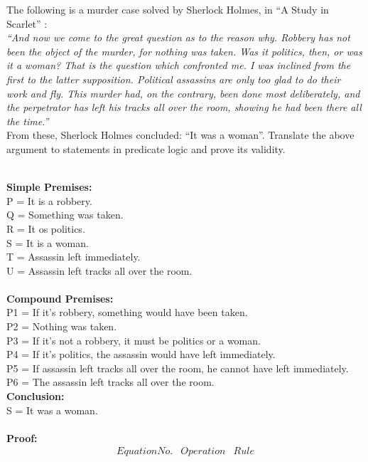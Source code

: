 \documentclass[addpoints]{exam}
\begin{document}
\begin{questions}
\question[10]
  The following is a murder case solved by Sherlock Holmes, in “A Study
  in Scarlet” :\\
  \textit{“And now we come to the great question as to the reason why. Robbery
    has not been the object of the murder, for nothing was taken. Was it
    politics, then, or was it a woman?  That is the question which confronted
    me. I was inclined from the first to the latter supposition. Political
    assassins are only too glad to do their work and fly. This murder had, on
    the contrary, been done most deliberately, and the perpetrator has left
    his tracks all over the room, showing he had been
    there all the time.”}\\
  From these, Sherlock Holmes concluded: ``It was a woman''.  Translate the
  above argument to statements in predicate logic and prove its validity.
  \begin{solution}\\
    \textbf{Simple Premises:}\\
    P = It is a robbery.\\
    Q = Something was taken.\\
    R = It os politics.\\
    S = It is a woman.\\
    T = Assassin left immediately.\\
    U = Assassin left tracks all over the room.\\\\
    \textbf{Compound Premises:}\\
    P1 = If it's robbery, something would have been taken.\\
    P2 = Nothing was taken.\\
    P3 = If it's not a robbery, it must be politics or a woman.\\
    P4 = If it's politics, the assassin would have left immediately.\\
    P5 = If assassin left tracks all over the room, he cannot have left immediately.\\
    P6 = The assassin left tracks all over the room.\\
    \textbf{Conclusion:}\\
    S = It was a woman.\\\\
    \textbf{Proof:}\\
    \[
      \begin{array}{c|c|c}
        Equation No. & Operation                     & Rule                              \\

\end{array}\]
\end{solution}
\end{questions}
\end{document}
